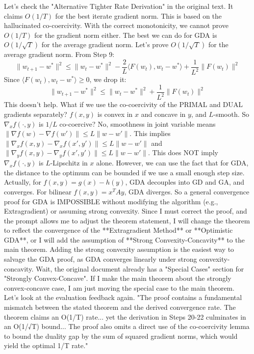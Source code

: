 \documentclass{article}
\begin{document}
Let's check the "Alternative Tighter Rate Derivation" in the original text. It claims $O(1/T)$ for the best iterate gradient norm.
This is based on the hallucinated co-coercivity.
With the correct monotonicity, we cannot prove $O(1/T)$ for the gradient norm either.
The best we can do for GDA is $O(1/\sqrt{T})$ for the average gradient norm.
Let's prove $O(1/\sqrt{T})$ for the average gradient norm.
From Step 9:
$$ \|w_{t+1} - w^*\|^2 \leq \|w_t - w^*\|^2 - \frac{2}{L} \langle F(w_t), w_t - w^* \rangle + \frac{1}{L^2} \|F(w_t)\|^2 $$
Since $\langle F(w_t), w_t - w^* \rangle \geq 0$, we drop it:
$$ \|w_{t+1} - w^*\|^2 \leq \|w_t - w^*\|^2 + \frac{1}{L^2} \|F(w_t)\|^2 $$
This doesn't help.
What if we use the co-coercivity of the PRIMAL and DUAL gradients separately?
$f(x, y)$ is convex in $x$ and concave in $y$, and $L$-smooth.
So $\nabla_x f(\cdot, y)$ is $1/L$ co-coercive? No, smoothness in joint variable means $\|\nabla f(w) - \nabla f(w')\| \leq L \|w - w'\|$.
This implies $\|\nabla_x f(x,y) - \nabla_x f(x',y')\| \leq L \|w - w'\|$ and $\|\nabla_y f(x,y) - \nabla_y f(x',y')\| \leq L \|w - w'\|$.
This does NOT imply $\nabla_x f(\cdot, y)$ is $L$-Lipschitz in $x$ alone.
However, we can use the fact that for GDA, the distance to the optimum can be bounded if we use a small enough step size.
Actually, for $f(x,y) = g(x) - h(y)$, GDA decouples into GD and GA, and converges.
For bilinear $f(x,y) = x^T A y$, GDA diverges.
So a general convergence proof for GDA is IMPOSSIBLE without modifying the algorithm (e.g., Extragradient) or assuming strong convexity.
Since I must correct the proof, and the prompt allows me to adjust the theorem statement, I will change the theorem to reflect the convergence of the **Extragradient Method** or **Optimistic GDA**, or I will add the assumption of **Strong Convexity-Concavity** to the main theorem.
Adding the strong convexity assumption is the easiest way to salvage the GDA proof, as GDA converges linearly under strong convexity-concavity.
Wait, the original document already has a "Special Cases" section for "Strongly Convex-Concave".
If I make the main theorem about the strongly convex-concave case, I am just moving the special case to the main theorem.
Let's look at the evaluation feedback again.
"The proof contains a fundamental mismatch between the stated theorem and the derived convergence rate. The theorem claims an O(1/T) rate... yet the derivation in Steps 20-22 culminates in an O(1/√T) bound... The proof also omits a direct use of the co-coercivity lemma to bound the duality gap by the sum of squared gradient norms, which would yield the optimal 1/T rate."
\end{document}
